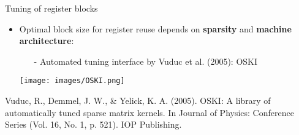 \documentclass[t,usepdftitle=false]{beamer}
\begin{document}
\begin{frame}{Tuning of register blocks}
\begin{itemize}
\item Optimal block size for register reuse depends on \textbf{sparsity} and \textbf{machine architecture}:
\begin{itemize}\normalsize
\item[-] Automated tuning interface by Vuduc et al. (2005): OSKI
\end{itemize}
\begin{center}\texttt{[image: images/OSKI.png]}\end{center}
\end{itemize}
\smallskip
\tiny{Vuduc, R., Demmel, J. W., \& Yelick, K. A. (2005). OSKI: A library of automatically tuned sparse matrix kernels. In Journal of Physics: Conference Series (Vol. 16, No. 1, p. 521). IOP Publishing.}
\end{frame}
\end{document}
